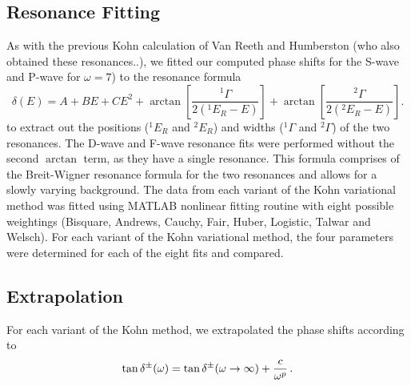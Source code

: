 \documentclass[preprint,showpacs,preprintnumbers,amsmath,amssymb]{revtex4}
\newcommand{\beq}{\begin{equation}}
\newcommand{\eeq}{\end{equation}}
\def \bea{\begin{eqnarray}}
\def \eea{\end{eqnarray}}
\begin{document}
\subsection{Resonance Fitting}
As with the previous Kohn calculation of Van Reeth and Humberston (who also obtained these resonances..),
we fitted our computed phase shifts for the S-wave and P-wave for $\omega=7$) to
the resonance formula
\beq
\delta(E) = A + B E + C E^2 + \arctan \left[ \frac{^1\Gamma}{2(^1E_R - E)} \right] + \arctan \left[ \frac{^2\Gamma}{2(^2E_R - E)} \right].
\eeq
to extract out the positions ($^1E_R$ and $^2E_R$) and widths
($^1\Gamma$ and $^2\Gamma$) of the two resonances. The D-wave and F-wave resonance fits were performed without the second $\arctan$ term, as they have a single resonance. 
This formula comprises of the Breit-Wigner resonance
formula for the two resonances and allows for a slowly varying
background.
The data from each variant of the Kohn variational method was fitted using MATLAB nonlinear fitting routine with eight possible  weightings
(Bisquare, Andrews, Cauchy, Fair, Huber, Logistic, Talwar and Welsch).
For each variant of the Kohn variational method, the four parameters were determined for each
of the eight fits and compared.

\subsection{Extrapolation}
For each variant of the Kohn method, we extrapolated the phase shifts according to 
\bea
\tan\delta^\pm(\omega) = \tan\delta^\pm(\omega\to\infty) + {c\over \omega^p}\, .
\eea
\end{document}
